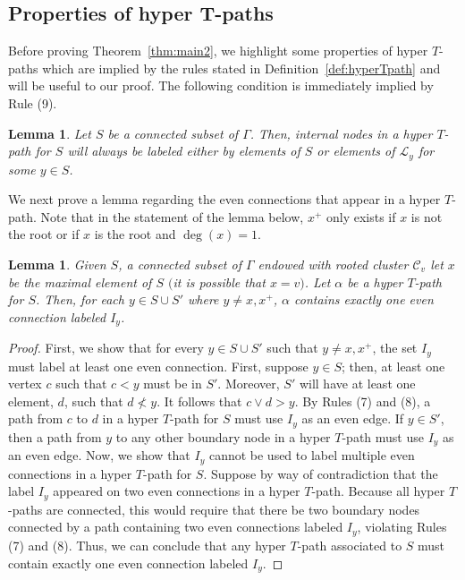\documentclass[pdftex]{sigma}
\numberwithin{equation}{section}
\newtheorem{Lemma}[Theorem]{Lemma}
\begin{document}
\subsection[Properties of hyper T-paths]{Properties of hyper $\boldsymbol{T}$-paths}\label{sec:T-path-lems}
Before proving Theorem~\ref{thm:main2}, we highlight some properties of hyper $T$-paths which are implied by the rules stated in Definition~\ref{def:hyperTpath} and will be useful to our proof.
The following condition is immediately implied by Rule (9).
\begin{Lemma}\label{lem:internalnodes}
Let $S$ be a connected subset of $\Gamma$. Then, internal nodes in a hyper $T$-path for $S$ will always be labeled either by elements of $S$ or elements of $\mathcal{L}_y$ for some $y \in S$.
\end{Lemma}
We next prove a lemma regarding the even connections that appear in a hyper $T$-path. Note that in the statement of the lemma below, $x^+$ only exists if $x$ is not the root or if $x$ is the root and $\deg(x) = 1$.
\begin{Lemma}\label{lem:evenconnections}
Given $S$, a connected subset of $\Gamma$ endowed with rooted cluster $\mathcal{C}_v$ let $x$ be the maximal element of $S$ $($it is possible that $x = v)$. Let $\alpha$ be a hyper $T$-path for $S$. Then, for each $y \in S \cup S'$ where $y \neq x,x^+$, $\alpha$ contains exactly one even connection labeled $I_y$.
\end{Lemma}
\begin{proof}
First, we show that for every $y \in S \cup S'$ such that $y \neq x,x^+$, the set $I_y$ must label at least one even connection. First, suppose $y \in S$; then, at least one vertex $c$ such that $c<y$ must be in $S'$. Moreover, $S'$ will have at least one element, $d$, such that $d \nless y$. It follows that $c \vee d > y$. By Rules (7) and (8), a path from $c$ to $d$ in a hyper $T$-path for $S$ must use $I_y$ as an even edge.
If $y \in S'$, then a path from $y$ to any other boundary node in a hyper $T$-path must use $I_y$ as an even edge.
Now, we show that $I_y$ cannot be used to label multiple even connections in a hyper $T$-path for $S$. Suppose by way of contradiction that the label $I_y$ appeared on two even connections in a hyper $T$-path. Because all hyper $T$-paths are connected, this would require that there be two boundary nodes connected by a path containing two even connections labeled $I_y$, violating Rules (7) and (8). Thus, we can conclude that any hyper $T$-path associated to $S$ must contain exactly one even connection labeled $I_y$.
\end{proof}
\end{document}
